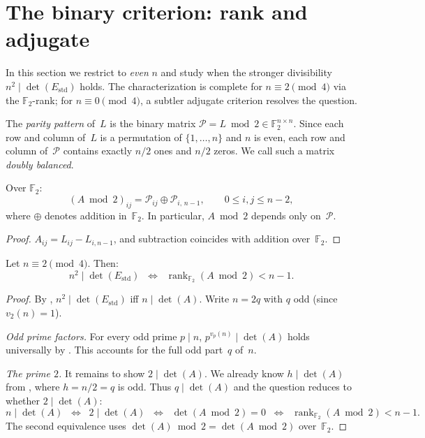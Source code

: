 \documentclass[11pt,a4paper]{article}
\newcommand{\FF}{\mathbb{F}}
\newcommand{\rank}{\operatorname{rank}}
\newcommand{\Estd}{E_{\mathrm{std}}}
\begin{document}
\section{The binary criterion: rank and adjugate}\label{sec:parity}

In this section we restrict to \emph{even} $n$ and study when the
stronger divisibility $n^2\mid\det(\Estd)$ holds.  The characterization
is complete for $n\equiv 2\pmod{4}$ via the $\FF_2$-rank; for
$n\equiv 0\pmod{4}$, a subtler adjugate criterion resolves the question.

\begin{definition}
The \emph{parity pattern} of~$L$ is the binary matrix
$\mathcal{P}=L\bmod 2 \in \FF_2^{n\times n}$.  Since each row and column
of~$L$ is a permutation of $\{1,\dots,n\}$ and $n$ is even, each row and
column of~$\mathcal{P}$ contains exactly $n/2$ ones and $n/2$ zeros.
We call such a matrix \emph{doubly balanced}.
\end{definition}

\begin{lemma}\label{lem:Amod2}
Over $\FF_2$:
\[
  (A\bmod 2)_{ij}
  = \mathcal{P}_{ij}\oplus\mathcal{P}_{i,\,n-1},
  \qquad 0\le i,j\le n-2,
\]
where $\oplus$ denotes addition in~$\FF_2$.  In particular, $A\bmod 2$
depends only on~$\mathcal{P}$.
\end{lemma}

\begin{proof}
$A_{ij}=L_{ij}-L_{i,n-1}$, and subtraction coincides with addition
over~$\FF_2$.
\end{proof}

\begin{theorem}[$\FF_2$-rank characterization]\label{thm:F2-characterization}
Let $n\equiv 2\pmod{4}$.  Then:
\[
  n^2\mid\det(\Estd)
  \;\;\Longleftrightarrow\;\;
  \rank_{\FF_2}(A\bmod 2) < n-1.
\]
\end{theorem}

\begin{proof}
By , $n^2\mid\det(\Estd)$ iff $n\mid\det(A)$.  Write
$n=2q$ with $q$ odd (since $v_2(n)=1$).

\medskip\noindent
\emph{Odd prime factors.}  For every odd prime $p\mid n$,
$p^{v_p(n)}\mid\det(A)$
holds universally by .  This accounts for the full
odd part~$q$ of~$n$.

\medskip\noindent
\emph{The prime $2$.}  It remains to show $2\mid\det(A)$.  We already
know $h\mid\det(A)$ from , where $h=n/2=q$ is odd.
Thus $q\mid\det(A)$ and the question reduces to whether
$2\mid\det(A)$:
\[
  n\mid\det(A)
  \;\;\Longleftrightarrow\;\;
  2\mid\det(A)
  \;\;\Longleftrightarrow\;\;
  \det(A\bmod 2)=0
  \;\;\Longleftrightarrow\;\;
  \rank_{\FF_2}(A\bmod 2)<n-1.
\]
The second equivalence uses $\det(A)\bmod 2 = \det(A\bmod 2)$ over~$\FF_2$.
\end{proof}
\end{document}
